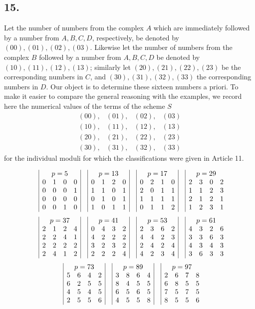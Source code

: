 \documentclass[12pt]{article}
\begin{document}
\subsection*{15.}

Let the number of numbers from the complex $A$ which are immediately followed by a number from $A,B,C,D$, respectively, be denoted by $(00),(01),(02),(03)$. Likewise let the number of numbers from the complex $B$ followed by a number from $A,B,C,D$ be denoted by $(10),(11),(12),(13)$; similarly let $(20),(21),(22),(23)$ be the corresponding numbers in $C$, and $(30),(31),(32),(33)$ the corresponding numbers in $D$. Our object is to determine these sixteen numbers a priori. To make it easier to compare the general reasoning with the examples, we record here the numerical values of the terms of the scheme $S$
\[
\begin{array}{llll}
(00),&(01),&(02),&(03)\\
(10),&(11),&(12),&(13)\\
(20),&(21),&(22),&(23)\\
(30),&(31),&(32),&(33)
\end{array}
\]
for the individual moduli for which the classifications were given in Article 11.

\[
\begin{array}{c|rrrr|c|rrrr|c|rrrr|c|rrrr}
&\multicolumn{4}{c|}{p=5}&&\multicolumn{4}{c|}{p=13}&&\multicolumn{4}{c|}{p=17}&&\multicolumn{4}{c}{p=29}\\
&0&1&0&0&&0&1&2&0&&0&2&1&0&&2&3&0&2\\
&0&0&0&1&&1&1&0&1&&2&0&1&1&&1&1&2&3\\
&0&0&0&0&&0&1&0&1&&1&1&1&1&&2&1&2&1\\
&0&0&1&0&&1&0&1&1&&0&1&1&2&&1&2&3&1
\end{array}
\]
\[
\begin{array}{c|rrrr|c|rrrr|c|rrrr|c|rrrr}
&\multicolumn{4}{c|}{p=37}&&\multicolumn{4}{c|}{p=41}&&\multicolumn{4}{c|}{p=53}&&\multicolumn{4}{c}{p=61}\\
&2&1&2&4&&0&4&3&2&&2&3&6&2&&4&3&2&6\\
&2&2&4&1&&4&2&2&2&&4&4&2&3&&3&3&6&3\\
&2&2&2&2&&3&2&3&2&&2&4&2&4&&4&3&4&3\\
&2&4&1&2&&2&2&2&4&&4&2&3&4&&3&6&3&3
\end{array}
\]
\[
\begin{array}{c|rrrr|c|rrrr|c|rrrr}
&\multicolumn{4}{c|}{p=73}&&\multicolumn{4}{c|}{p=89}&&\multicolumn{4}{c}{p=97}\\
&5&6&4&2&&3&8&6&4&&2&6&7&8\\
&6&2&5&5&&8&4&5&5&&6&8&5&5\\
&4&5&4&5&&6&5&6&5&&7&5&7&5\\
&2&5&5&6&&4&5&5&8&&8&5&5&6
\end{array}
\]
\end{document}
